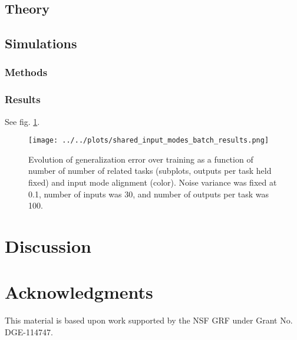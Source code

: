 \documentclass{article}
\begin{document}
\subsection{Theory}
\subsection{Simulations}
\subsubsection{Methods}
\subsubsection{Results}
See fig. \ref{multi_task_results}.
\begin{figure}
\centering
\texttt{[image: ../../plots/shared\_input\_modes\_batch\_results.png]}
\caption{Evolution of generalization error over training as a function of number of number of related tasks (subplots, outputs per task held fixed) and input mode alignment (color). Noise variance was fixed at 0.1, number of inputs was 30, and number of outputs per task was 100.}\label{multi_task_results}
\end{figure}

\section{Discussion}

\section{Acknowledgments}
This material is based upon work supported by the NSF GRF under Grant No. DGE-114747.



\end{document}
